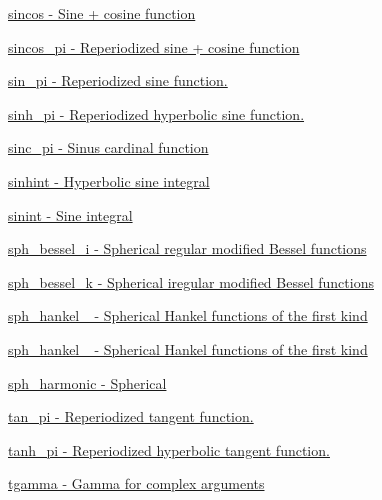 \begin{DoxyItemize}
\item \hyperlink{group__gnu__math__spec__func_ga8041c24b528475bcf8a4178e484652a3}{sincos -\/ Sine + cosine function}
\item \hyperlink{group__gnu__math__spec__func_ga3152cfc9d5fa04fbe61781b45b3d4c04}{sincos\+\_\+pi -\/ Reperiodized sine + cosine function}
\item \hyperlink{group__gnu__math__spec__func_gacd465f58d1ff0dbf15cf8d44c0729ba6}{sin\+\_\+pi -\/ Reperiodized sine function.}
\item \hyperlink{group__gnu__math__spec__func_gaaad53f580876c2dbc7e0e7a45b937990}{sinh\+\_\+pi -\/ Reperiodized hyperbolic sine function.}
\item \hyperlink{group__gnu__math__spec__func_ga3dbc3831c1bd9f2a8be05496db9375a0}{sinc\+\_\+pi -\/ Sinus cardinal function}
\item \hyperlink{group__gnu__math__spec__func_ga203079a2b70127f16a8c434ea55d4e06}{sinhint -\/ Hyperbolic sine integral}
\item \hyperlink{group__gnu__math__spec__func_gaa588265d28710d36c7c4efa7d4f44ca4}{sinint -\/ Sine integral}
\item \hyperlink{group__gnu__math__spec__func_gad168511a86d4d25db99e2b08d5da038b}{sph\+\_\+bessel\+\_\+i -\/ Spherical regular modified Bessel functions}
\item \hyperlink{group__gnu__math__spec__func_ga9ad96c43b15e2c53d2f1b743e2eaa90f}{sph\+\_\+bessel\+\_\+k -\/ Spherical iregular modified Bessel functions}
\item \hyperlink{group__gnu__math__spec__func_ga04c91059810f366e3366fadef9084be7}{sph\+\_\+hankel\+\_ -\/ Spherical Hankel functions of the first kind}
\item \hyperlink{group__gnu__math__spec__func_gafb5debe7f7db9e9e456c065acf738f64}{sph\+\_\+hankel\+\_ -\/ Spherical Hankel functions of the first kind}
\item \hyperlink{group__gnu__math__spec__func_gadca3d25c4f7eed15099d8f80681d4055}{sph\+\_\+harmonic -\/ Spherical}
\item \hyperlink{group__gnu__math__spec__func_gaaa0da4a6511e963be61a1e7f43348ff5}{tan\+\_\+pi -\/ Reperiodized tangent function.}
\item \hyperlink{group__gnu__math__spec__func_gae18891254bff63a37d11c8f15010fff4}{tanh\+\_\+pi -\/ Reperiodized hyperbolic tangent function.}
\item \hyperlink{group__gnu__math__spec__func_ga6133351c7602e917fd08d62d897e57d0}{tgamma -\/ Gamma for complex arguments}

\end{DoxyItemize}
